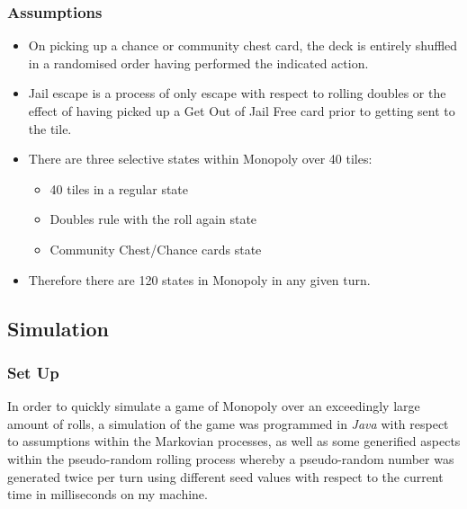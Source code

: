 \documentclass[12pt]{article}
\begin{document}
\subsubsection{Assumptions}
\begin{itemize}
\item On picking up a chance or community chest card, the deck is entirely shuffled in a randomised order having performed the indicated action.
\item Jail escape is a process of only escape with respect to rolling doubles or the effect of having picked up a Get Out of Jail Free card prior to getting sent to the tile.
\item There are three selective states within Monopoly over 40 tiles:
\begin{itemize}
\item 40 tiles in a regular state
\item Doubles rule with the roll again state
\item Community Chest/Chance cards state
\end{itemize}
\item Therefore there are 120 states in Monopoly in any given turn.
\end{itemize}

\subsection{Simulation}
\subsubsection{Set Up}
In order to quickly simulate a game of Monopoly over an exceedingly large amount of rolls, a simulation of the game was programmed in \emph{Java} with respect to assumptions within the Markovian processes, as well as some generified aspects within the pseudo-random rolling process whereby a pseudo-random number was generated twice per turn using different seed values with respect to the current time in milliseconds on my machine. 
\end{document}
